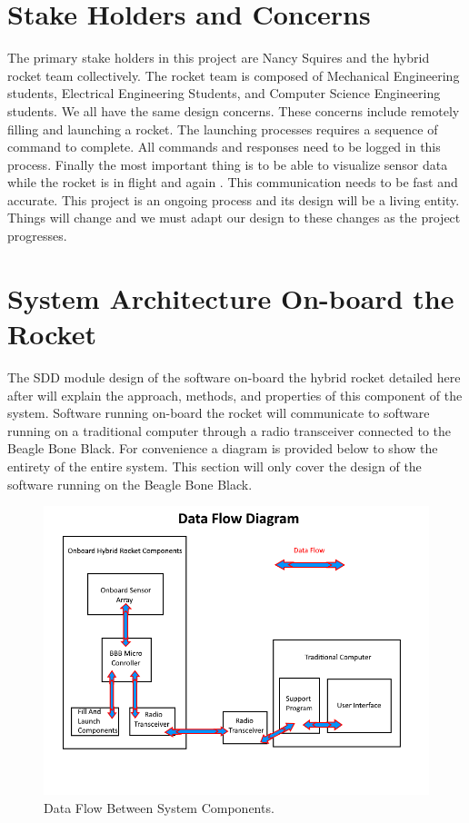 \documentclass[10pt,draftclsnofoot,onecolumn,compsoc]{IEEEtran}
\begin{document}
\section{Stake Holders and Concerns}
The primary stake holders in this project are Nancy Squires and the hybrid rocket team collectively. The rocket team is composed of Mechanical Engineering students, Electrical Engineering Students, and Computer Science Engineering students. We all have the same design concerns. These concerns include remotely filling and launching a rocket. The launching processes requires a sequence of command to complete. All commands and responses need to be logged in this process. Finally the most important thing is to be able to visualize sensor data while the rocket is in flight and again . This communication needs to be fast and accurate. This project is an ongoing process and its design will be a living entity. Things will change and we must adapt our design to these changes as the project progresses.
\section{System Architecture On-board the Rocket }	
The SDD module design of the software on-board the hybrid rocket detailed here after will explain the approach, methods, and properties of this component of the system. Software running on-board the rocket will communicate to software running on a traditional computer through a radio transceiver connected to the Beagle Bone Black. For convenience a diagram is provided below to show the entirety of the entire system. This section will  only cover the design of the software running on the Beagle Bone Black. \par

\begin{figure}[!ht]
  \caption{Data Flow Between System Components.}
  \centering
	\includegraphics[scale=.85]{RocketBlockDiagram}
\end{figure}
\FloatBarrier
\end{document}
